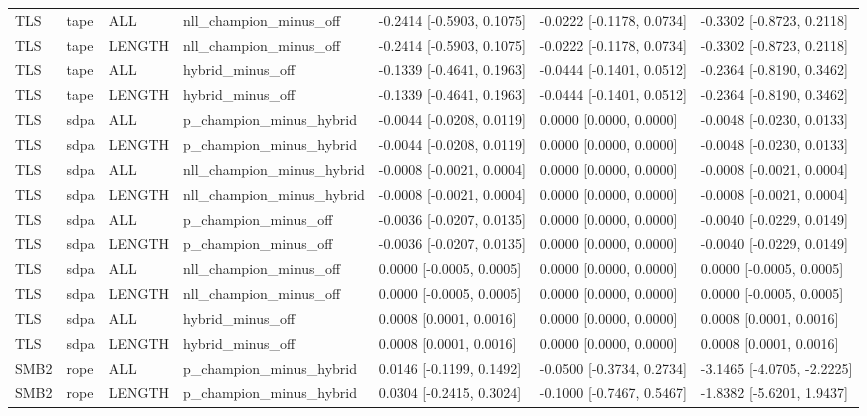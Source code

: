 \begin{tabular}{lllllll}
TLS & tape & ALL & nll\_champion\_minus\_off & -0.2414 [-0.5903, 0.1075] & -0.0222 [-0.1178, 0.0734] & -0.3302 [-0.8723, 0.2118] \\
TLS & tape & LENGTH & nll\_champion\_minus\_off & -0.2414 [-0.5903, 0.1075] & -0.0222 [-0.1178, 0.0734] & -0.3302 [-0.8723, 0.2118] \\
TLS & tape & ALL & hybrid\_minus\_off & -0.1339 [-0.4641, 0.1963] & -0.0444 [-0.1401, 0.0512] & -0.2364 [-0.8190, 0.3462] \\
TLS & tape & LENGTH & hybrid\_minus\_off & -0.1339 [-0.4641, 0.1963] & -0.0444 [-0.1401, 0.0512] & -0.2364 [-0.8190, 0.3462] \\
TLS & sdpa & ALL & p\_champion\_minus\_hybrid & -0.0044 [-0.0208, 0.0119] & 0.0000 [0.0000, 0.0000] & -0.0048 [-0.0230, 0.0133] \\
TLS & sdpa & LENGTH & p\_champion\_minus\_hybrid & -0.0044 [-0.0208, 0.0119] & 0.0000 [0.0000, 0.0000] & -0.0048 [-0.0230, 0.0133] \\
TLS & sdpa & ALL & nll\_champion\_minus\_hybrid & -0.0008 [-0.0021, 0.0004] & 0.0000 [0.0000, 0.0000] & -0.0008 [-0.0021, 0.0004] \\
TLS & sdpa & LENGTH & nll\_champion\_minus\_hybrid & -0.0008 [-0.0021, 0.0004] & 0.0000 [0.0000, 0.0000] & -0.0008 [-0.0021, 0.0004] \\
TLS & sdpa & ALL & p\_champion\_minus\_off & -0.0036 [-0.0207, 0.0135] & 0.0000 [0.0000, 0.0000] & -0.0040 [-0.0229, 0.0149] \\
TLS & sdpa & LENGTH & p\_champion\_minus\_off & -0.0036 [-0.0207, 0.0135] & 0.0000 [0.0000, 0.0000] & -0.0040 [-0.0229, 0.0149] \\
TLS & sdpa & ALL & nll\_champion\_minus\_off & 0.0000 [-0.0005, 0.0005] & 0.0000 [0.0000, 0.0000] & 0.0000 [-0.0005, 0.0005] \\
TLS & sdpa & LENGTH & nll\_champion\_minus\_off & 0.0000 [-0.0005, 0.0005] & 0.0000 [0.0000, 0.0000] & 0.0000 [-0.0005, 0.0005] \\
TLS & sdpa & ALL & hybrid\_minus\_off & 0.0008 [0.0001, 0.0016] & 0.0000 [0.0000, 0.0000] & 0.0008 [0.0001, 0.0016] \\
TLS & sdpa & LENGTH & hybrid\_minus\_off & 0.0008 [0.0001, 0.0016] & 0.0000 [0.0000, 0.0000] & 0.0008 [0.0001, 0.0016] \\
SMB2 & rope & ALL & p\_champion\_minus\_hybrid & 0.0146 [-0.1199, 0.1492] & -0.0500 [-0.3734, 0.2734] & -3.1465 [-4.0705, -2.2225] \\
SMB2 & rope & LENGTH & p\_champion\_minus\_hybrid & 0.0304 [-0.2415, 0.3024] & -0.1000 [-0.7467, 0.5467] & -1.8382 [-5.6201, 1.9437] \\

\end{tabular}

